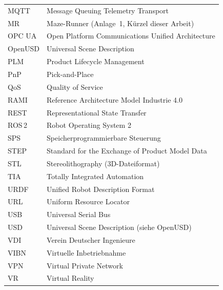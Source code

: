 \begin{longtable}{lp{12.5cm}}
MQTT   & Message Queuing Telemetry Transport \\
MR     & Maze-Runner (Anlage~1, Kürzel dieser Arbeit) \\
OPC UA & Open Platform Communications Unified Architecture \\
OpenUSD& Universal Scene Description \\
PLM    & Product Lifecycle Management \\
PnP    & Pick-and-Place \\
QoS    & Quality of Service \\
RAMI   & Reference Architecture Model Industrie 4.0 \\
REST   & Representational State Transfer \\
ROS\,2 & Robot Operating System 2 \\
SPS    & Speicherprogrammierbare Steuerung \\
STEP   & Standard for the Exchange of Product Model Data \\
STL    & Stereolithography (3D-Dateiformat) \\
TIA    & Totally Integrated Automation \\
URDF   & Unified Robot Description Format \\
URL    & Uniform Resource Locator \\
USB    & Universal Serial Bus \\
USD    & Universal Scene Description (siehe OpenUSD) \\
VDI    & Verein Deutscher Ingenieure \\
VIBN   & Virtuelle Inbetriebnahme \\
VPN    & Virtual Private Network \\
VR     & Virtual Reality \\
\bottomrule
\end{longtable}
